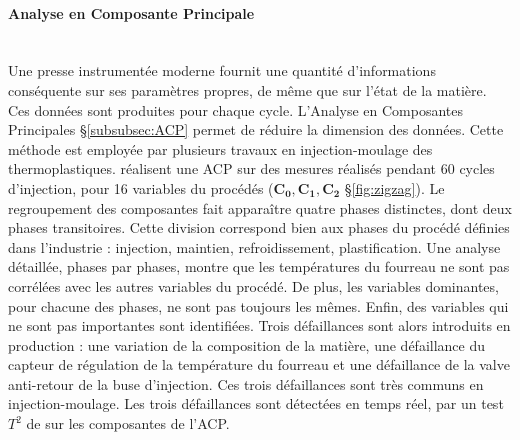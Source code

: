 \paragraph{Analyse en Composante Principale}\mbox{} \\
Une presse instrumentée moderne fournit une quantité d’informations conséquente sur ses paramètres propres, de même que sur l’état de la matière.
Ces données sont produites pour chaque cycle.
L’Analyse en Composantes Principales §\ref{subsubsec:ACP} permet de réduire la dimension des données.
Cette méthode est employée par plusieurs travaux en injection-moulage des thermoplastiques.
\citeauthor{lu_stagebased_2004} \cite{lu_stagebased_2004} réalisent une ACP sur des mesures réalisés pendant 60 cycles d'injection, pour 16 variables du procédés ($\boldsymbol{C_0, C_1, C_2}$ §\ref{fig:zigzag}).
Le regroupement des composantes fait apparaître quatre phases distinctes, dont deux phases transitoires.
Cette division correspond bien aux phases du procédé définies dans l'industrie : injection, maintien, refroidissement, plastification.
Une analyse détaillée, phases par phases, montre que les températures du fourreau ne sont pas corrélées avec les autres variables du procédé.
De plus, les variables dominantes, pour chacune des phases, ne sont pas toujours les mêmes.
Enfin, des variables qui ne sont pas importantes sont identifiées.
Trois défaillances sont alors introduits en production : une variation de la composition de la matière, une défaillance du capteur de régulation de la température du fourreau et une défaillance de la valve anti-retour de la buse d’injection.
Ces trois défaillances sont très communs en injection-moulage.
Les trois défaillances sont détectées en temps réel, par un test $T^2$ de \citeauthor{hotelling_analysis_1933} \cite{hotelling_analysis_1933} sur les composantes de l'ACP.

